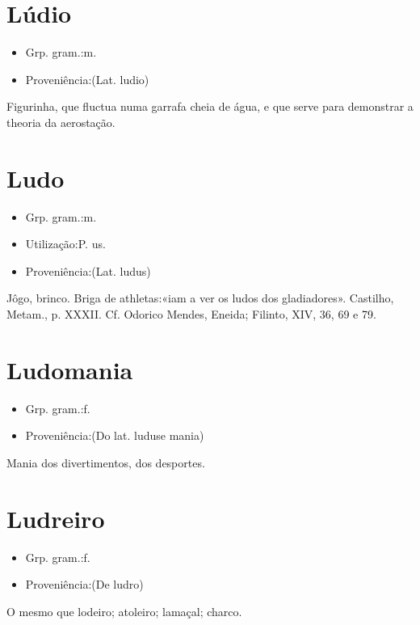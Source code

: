 \section{Lúdio}
\begin{itemize}
\item {Grp. gram.:m.}
\end{itemize}
\begin{itemize}
\item {Proveniência:(Lat. \textunderscore ludio\textunderscore )}
\end{itemize}
Figurinha, que fluctua numa garrafa cheia de água, e que serve para demonstrar a theoria da aerostação.
\section{Ludo}
\begin{itemize}
\item {Grp. gram.:m.}
\end{itemize}
\begin{itemize}
\item {Utilização:P. us.}
\end{itemize}
\begin{itemize}
\item {Proveniência:(Lat. \textunderscore ludus\textunderscore )}
\end{itemize}
Jôgo, brinco.
Briga de athletas:«\textunderscore iam a ver os ludos dos gladiadores\textunderscore ». Castilho, \textunderscore Metam.\textunderscore , p. XXXII. Cf. Odorico Mendes, \textunderscore Eneida\textunderscore ; Filinto, XIV, 36, 69 e 79.
\section{Ludomania}
\begin{itemize}
\item {Grp. gram.:f.}
\end{itemize}
\begin{itemize}
\item {Proveniência:(Do lat. \textunderscore ludus\textunderscore  e \textunderscore mania\textunderscore )}
\end{itemize}
Mania dos divertimentos, dos desportes.
\section{Ludreiro}
\begin{itemize}
\item {Grp. gram.:f.}
\end{itemize}
\begin{itemize}
\item {Proveniência:(De \textunderscore ludro\textunderscore )}
\end{itemize}
O mesmo que \textunderscore lodeiro\textunderscore ; atoleiro; lamaçal; charco.
